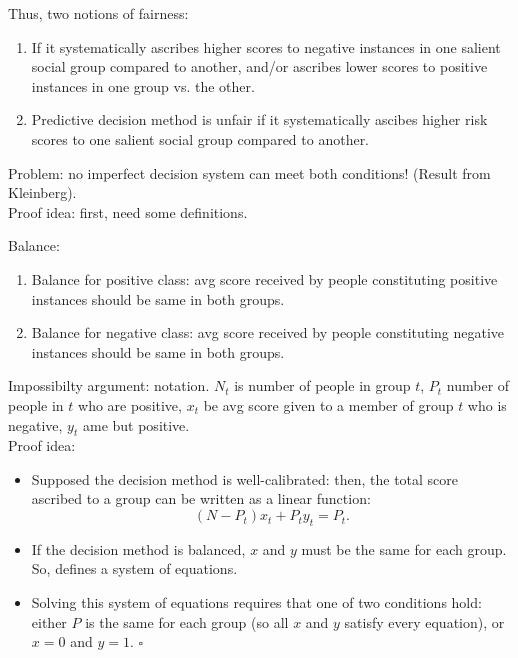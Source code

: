 Thus, two notions of fairness:
\begin{enumerate}
\item If it systematically ascribes higher scores to negative instances in one salient social group compared to another, and/or ascribes lower scores to positive instances in one group vs. the other. 
\item Predictive decision method is unfair if it systematically ascibes higher risk scores to one salient social group compared to another.
\end{enumerate}

Problem: no imperfect decision system can meet both conditions! (Result from Kleinberg). \\

Proof idea: first, need some definitions.


Balance:
\begin{enumerate}
	\item Balance for positive class: avg score received by people constituting positive instances should be same in both groups.
	\item Balance for negative class: avg score received by people constituting negative instances should be same in both groups.
\end{enumerate}

Impossibilty argument: notation. $N_t$ is number of people in group $t$, $P_t$ number of people in $t$ who are positive, $x_t$ be avg score given to a member of group $t$ who is negative, $y_t$ ame but positive. \\

Proof idea:
\begin{itemize}
\item Supposed the decision method is well-calibrated: then, the total score ascribed to a group can be written as a linear function: 
\[
(N - P_t)x_t + P_t y_t = P_t.
\]
\item If the decision method is balanced, $x$ and $y$ must be the same for each group. So, defines a system of equations.
\item Solving this system of equations requires that one of two conditions hold: either $P$ is the same for each group (so all $x$ and $y$ satisfy every equation), or $x=0$ and $y=1$. $\square$
	\end{itemize}


